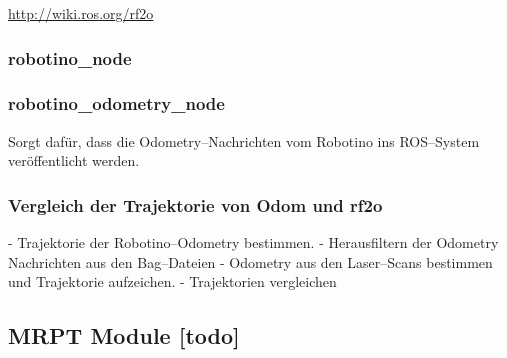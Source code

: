\url{http://wiki.ros.org/rf2o}


\begin{comment}
------------------------------------------------------------------------------------------
\end{comment}
\subsubsection{robotino\_node}


\begin{comment}
------------------------------------------------------------------------------------------
\end{comment}
\subsubsection{robotino\_odometry\_node}

Sorgt dafür, dass die Odometry--Nachrichten vom Robotino ins ROS--System veröffentlicht werden.


\begin{comment}
------------------------------------------------------------------------------------------
\end{comment}
\subsubsection{Vergleich der Trajektorie von Odom und rf2o}

- Trajektorie der Robotino--Odometry bestimmen.
- Herausfiltern der Odometry Nachrichten aus den Bag--Dateien
- Odometry aus den Laser--Scans bestimmen und Trajektorie aufzeichen.
- Trajektorien vergleichen




\begin{comment}
------------------------------------------------------------------------------------------
\end{comment}
\subsection{MRPT Module [todo]}